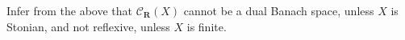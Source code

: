 Infer from the above that $\mathcal{C}_{\mathbf{R}}(X)$ cannot be a dual Banach space, unless $X$ is Stonian, and not reflexive, unless $X$ is finite.

